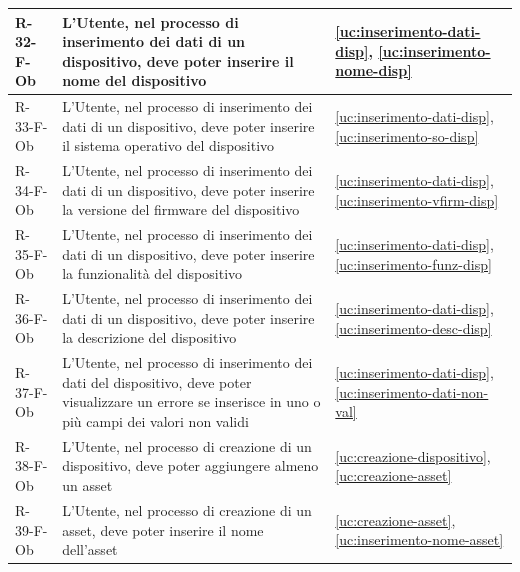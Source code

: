 ﻿\documentclass[a4paper,12pt]{article}
\begin{document}
{{\begin{longtable}{|l|p{}|p{}|}
            R-32-F-Ob       & L'Utente, nel processo di inserimento dei dati di un dispositivo, deve poter inserire il nome del dispositivo                                                                               & \ref{uc:inserimento-dati-disp}, \ref{uc:inserimento-nome-disp}         \\ \hline
            R-33-F-Ob       & L'Utente, nel processo di inserimento dei dati di un dispositivo, deve poter inserire il sistema operativo del dispositivo                                                                  & \ref{uc:inserimento-dati-disp}, \ref{uc:inserimento-so-disp}         \\ \hline
            R-34-F-Ob       & L'Utente, nel processo di inserimento dei dati di un dispositivo, deve poter inserire la versione del firmware del dispositivo                                                              & \ref{uc:inserimento-dati-disp}, \ref{uc:inserimento-vfirm-disp}         \\ \hline
            R-35-F-Ob       & L'Utente, nel processo di inserimento dei dati di un dispositivo, deve poter inserire la funzionalità del dispositivo                                                                       & \ref{uc:inserimento-dati-disp}, \ref{uc:inserimento-funz-disp}         \\ \hline
            R-36-F-Ob       & L'Utente, nel processo di inserimento dei dati di un dispositivo, deve poter inserire la descrizione del dispositivo                                                                        & \ref{uc:inserimento-dati-disp}, \ref{uc:inserimento-desc-disp}         \\ \hline
            R-37-F-Ob       & L'Utente, nel processo di inserimento dei dati del dispositivo, deve poter visualizzare un errore se inserisce in uno o più campi dei valori non validi                                     & \ref{uc:inserimento-dati-disp}, \ref{uc:inserimento-dati-non-val}                 \\ \hline
            R-38-F-Ob       & L'Utente, nel processo di creazione di un dispositivo, deve poter aggiungere almeno un asset                                                                                                & \ref{uc:creazione-dispositivo}, \ref{uc:creazione-asset}                     \\ \hline
            R-39-F-Ob       & L'Utente, nel processo di creazione di un asset, deve poter inserire il nome dell'asset                                                                                                     & \ref{uc:creazione-asset}, \ref{uc:inserimento-nome-asset}                 \\ \hline

\end{longtable}}}
\end{document}
